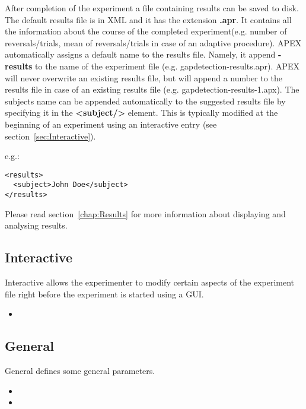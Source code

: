 
After completion of the experiment a file containing results can be saved to disk. The default results file is in XML and it has the extension \textbf{.apr}. It contains all the
information about the course of the completed experiment(e.g. number of reversals/trials, mean of reversals/trials in case of an adaptive procedure). 
APEX automatically assigns a default name to the results file. Namely, it append \textbf{-results }to the name of the experiment file (e.g. gapdetection-results.apr). APEX will never overwrite an existing results file, but will append a number to the results file in case of an existing results file (e.g. gapdetection-results-1.apx). The subjects name can be appended automatically to the suggested results file by specifying it in the \textbf{<subject/>} element. This is typically modified at the beginning of an experiment using an interactive entry (see section~\ref{sec:Interactive}).

e.g.:

\begin{lstlisting}
<results>
  <subject>John Doe</subject>
</results>
\end{lstlisting}

Please read section~\ref{chap:Results} for more information about displaying and analysing results.

\subsection{Interactive}

\label{sec:Interactive}

Interactive allows the experimenter to modify certain aspects of
the experiment file right before the experiment is started using a
GUI.


\begin{itemize}
\item {}
\end{itemize}

\subsection{General}
General defines some general parameters.

\label{sec:General}
\begin{itemize}
\item {}

\item {}
\end{itemize}

